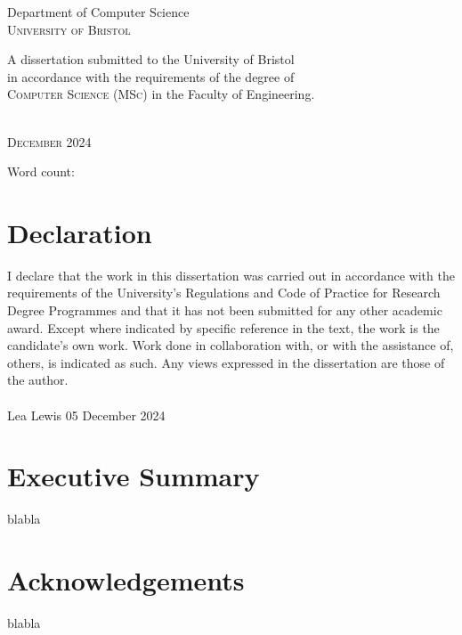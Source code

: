 \documentclass[11pt,a4paper]{article}
\numberwithin{figure}{section}
\newcommand{\dhorline}[3][0]{
    \tikz[baseline]{\path[decoration={markings,
      mark=between positions 0 and 1 step 2*#3
      with {\node[fill, circle, minimum width=#3, inner sep=0pt, anchor=south west] {};}},postaction={decorate}]  (0,#1) -- ++ (#2,0);}}
\begin{document}
\begin{center}
      \vspace{6mm}
      {\large Department of Computer Science \\ \textsc{University of Bristol}} \\
      \vspace{11mm}
      \begin{minipage}{9.5cm}
         \begin{center}
            A dissertation submitted to the University of Bristol \\ in accordance with the requirements of the degree of \\ \textsc{Computer Science (MSc)}
            in the Faculty of Engineering.
         \end{center}
      \end{minipage} \\
      \vspace{9mm}
      {\large\textsc{December 2024}}
      \vspace{12mm}
      \end{center}
   \begin{flushright}
      {\small Word count:}
   \end{flushright}
   \clearpage

   \section*{Declaration}
   I declare that the work in this dissertation was carried out in accordance with the requirements
   of the University’s Regulations and Code of Practice for Research Degree Programmes and
   that it has not been submitted for any other academic award. Except where indicated by
   specific reference in the text, the work is the candidate’s own work. Work done in collaboration
   with, or with the assistance of, others, is indicated as such. Any views expressed in the
   dissertation are those of the author.
   \vspace{40mm} \\
   \dhorline{\linewidth}{2pt} \\
   Lea Lewis
   \hfill
   05 December 2024
   \clearpage

   \section*{Executive Summary}
   blabla
   \clearpage


   \section*{Acknowledgements}
   blabla
   \clearpage
\end{document}
